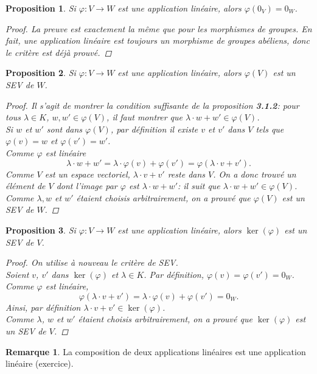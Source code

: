 \documentclass[oneside,12pt,french,table]{book}
\newtheorem{prop}{Proposition}[section]
\theoremstyle{definition}
\theoremstyle{definition}
\theoremstyle{definition}
\newtheorem*{remark}{Remarque}
\begin{document}
\begin{prop}
Si $\varphi : V \longrightarrow W$ est une application linéaire, alors $\varphi(0_V) = 0_W$.
\begin{proof}
 La preuve est exactement la même que pour les morphismes de groupes. En fait, une application linéaire est toujours un morphisme de groupes abéliens, donc le critère est déjà prouvé.
\end{proof}
\end{prop}
\begin{prop}
Si $\varphi : V \longrightarrow W$ est une application linéaire, alors $\varphi(V)$ est un SEV de $W$.
\begin{proof}
Il s'agit de montrer la condition suffisante de la proposition \textbf{3.1.2}: pour tous $\lambda \in K$, $w, w' \in \varphi(V)$, il faut montrer que $\lambda \cdot w + w' \in \varphi(V)$. \\
Si $w$ et $w'$ sont dans $\varphi(V)$, par définition il existe $v$ et $v'$ dans $V$ tels que $\varphi(v) = w$ et $\varphi(v')=w'$. \\
Comme $\varphi$ est linéaire $$\lambda \cdot w + w' = \lambda \cdot \varphi(v) + \varphi(v') = \varphi(\lambda \cdot v + v').$$
Comme $V$ est un espace vectoriel, $\lambda \cdot v + v'$ reste dans $V$. On a donc trouvé un élément de $V$ dont l'image par $\varphi$ est $\lambda \cdot w + w'$: il suit que $\lambda \cdot w + w' \in \varphi(V)$. \\
Comme $\lambda, w$ et $w'$ étaient choisis arbitrairement, on a prouvé que $\varphi(V)$ est un SEV de $W$.
\end{proof}
\end{prop}
\begin{prop}
Si $\varphi : V \longrightarrow W$ est une application linéaire, alors $\ker(\varphi)$ est un SEV de $V$.
\begin{proof}
On utilise à nouveau le critère de SEV. \\
Soient $v$, $v'$ dans $\ker(\varphi)$ et $\lambda \in K$. Par définition, $\varphi(v) = \varphi(v') = 0_W$. \\
Comme $\varphi$ est linéaire, $$\varphi(\lambda \cdot v + v')=\lambda \cdot \varphi(v) + \varphi(v') = 0_W.$$
Ainsi, par définition $\lambda \cdot v + v' \in \ker(\varphi)$. \\
Comme $\lambda$, $w$ et $w'$ étaient choisis arbitrairement, on a prouvé que $\ker(\varphi)$ est un SEV de $V$.
\end{proof}
\end{prop}
\begin{remark}
    La composition de deux applications linéaires est une application linéaire (exercice).
\end{remark}
\end{document}

